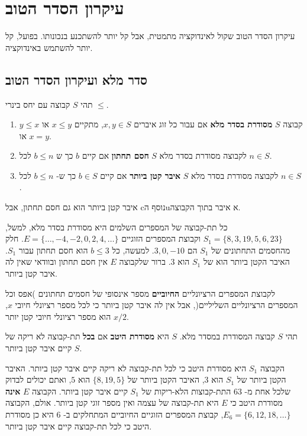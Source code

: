
\chapter{%
עיקרון הסדר הטוב%
}\label{s.well}

עיקרון הסדר הטוב שקול לאינדוקציה מתמטית, אבל קל יותר להשתכנע בנכונותו. בפועל, קל יותר להשתמש באינדוקציה.

\section{%
סדר מלא ועיקרון הסדר הטוב%
}

\begin{definition}
תהי 
$S$
קבוצה עם יחס בינרי
$\leq$.
\begin{enumerate}
\item
קבוצה
$S$
\textbf{מסודרת בסדר מלא}
אם עבור כל זוג איברים
$x,y\in S$,
מתקיים
$x\leq y$
או
$y \leq x$
או
$x=y$.
\item
לקבוצה מסודרת בסדר מלא
$S$
\textbf{חסם תחתון}
אם קיים
$b$
כך ש
$b\leq n$
לכל
$n\in S$.
\item
לקבוצה מסודרת בסדר מלא
$S$
\textbf{איבר קטן ביותר}
אם קיים
$b\in S$
כך ש-%
$b\leq n$
לכל
$n\in S$.
\end{enumerate}
\end{definition}
איבר קטן ביותר הוא גם חסם תחתון, אבל cנוסף הuא איבר בתוך הקבוצה.

כל תת-קבוצה של המספרים השלמים היא מסודרת בסדר מלא, למשל,
$S_1=\{8,3,19,5,6,23\}$
וקבוצת המספרים הזוגיים
$E=\{\ldots, -4, -2, 0, 2, 4, \ldots\}$.
חלק מהחסמים התחתונים של
$S_1$
הם
$3, 0, -10$.
למעשה, כל
$b\leq 3$
הוא חסם תחתון עבור
$S_1$.
האיבר הקטן ביותר הוא של
$S_1$
הוא
$3$.
ברור שלקבוצה
$E$
אין חסם תחתון ובוודאי שאין לה איבר קטן ביותר.

לקבוצת המספרים הרציונליים 
\textbf{החיוביים}
מספר אינסופי של חסמים תחתונים )אפס וכל המספרים הרציונליים השליליים(, אבל אין לה איבר קטן ביותר כי לכל מספר רציונלי חיובי
$x$, $x/2$
הוא מספר רציונלי חיובי קטן יותר.

\begin{definition}
תהי 
$S$
קבוצה המסודרת במסדר מלא.
$S$
היא
\textbf{מסודרת היטב}
אם
\textbf{בכל}
תת-קבוצה לא ריקה
של 
$S$
קיים איבר קטן ביותר.
\end{definition}

הקבוצה
$S_1$
היא מסודרת היטב כי לכל תת-קבוצה לא ריקה קיים איבר קטן ביותר. האיבר הקטן ביותר של 
$S_1$
הוא
$3$,
האיבר הקטן ביותר של
$\{8, 19, 5\}$
הוא
$5$,
ואתם יכולים לבדוק שלכל אחת מ-%
$63$
התת-קבוצות הלא-ריקות של
$S_1$
קיים איבר קטן ביותר. הקבוצה
$E$
\textbf{אינה}
מסודרת היטב כי 
$E$
היא תת-קבוצה של עצמה ואין מספר זוגי קטן ביותר. אולם, הקבוצה
$E_6=\{6,12,18,\ldots\}$,
קבוצת המספרים הזוגיים החיוביים המתחלקים ב-%
$6$
היא כן מסודרת היטב כי לכל תת-קבוצה קיים איבר קטן ביותר.

